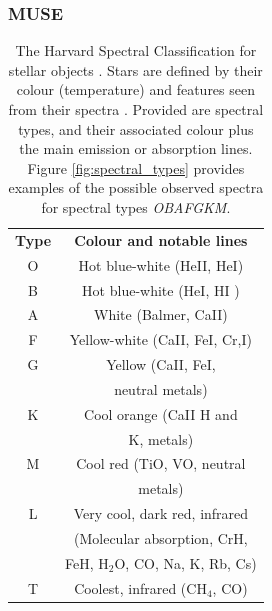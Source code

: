 \documentclass[12pt, twocolumn]{revtex4-1}    %
\begin{document}
\subsubsection{MUSE}

\begin{table}
\begin{center}
\begin{tabular}{c@{\hskip 20pt}c} 
 \hline
 \textbf{Type} & \textbf{Colour and notable lines} \\ [0.5ex] 
 O & Hot blue-white (HeII, HeI) \\
 B & Hot blue-white (HeI, HI ) \\
 A & White (Balmer, CaII) \\
 F & Yellow-white (CaII, FeI, Cr,I) \\
 G & Yellow (CaII, FeI,  \\
  & neutral metals) \\
 K & Cool orange (CaII H and \\ 
  & K, metals) \\
 M & Cool red (TiO, VO, neutral \\
  & metals) \\
 L & Very cool, dark red, infrared \\
  & (Molecular absorption, CrH, \\
  & FeH, H$_2$O, CO, Na, K, Rb, Cs) \\
 T & Coolest, infrared (CH$_4$, CO) \\
 \hline
\end{tabular}
\caption{The Harvard Spectral Classification for stellar objects \citep{1916AnHar..76...19C}. Stars are defined by their colour (temperature) and features seen from their spectra \citep{stellar_colour, 1925PhDT.........1P}. Provided are spectral types, and their associated colour plus the main emission or absorption lines. Figure \ref{fig:spectral_types} provides examples of the possible observed spectra for spectral types \textit{OBAFGKM}.}
\label{table:spectral_classification}
\end{center}
\end{table}
\end{document}
